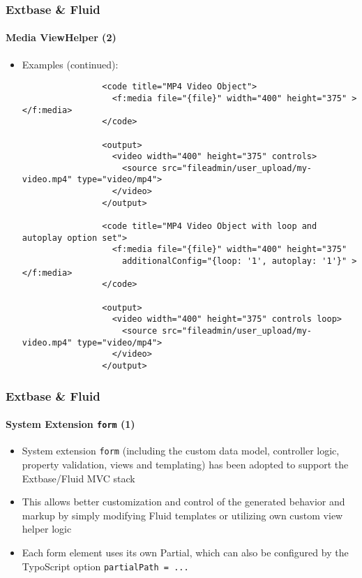 \begin{frame}[fragile]
	\frametitle{Extbase \& Fluid}
	\framesubtitle{Media ViewHelper (2)}

	\lstset{basicstyle=\tiny\ttfamily}

	\begin{itemize}

		\item Examples (continued):

			\begin{lstlisting}
				<code title="MP4 Video Object">
				  <f:media file="{file}" width="400" height="375" ></f:media>
				</code>

				<output>
				  <video width="400" height="375" controls>
				    <source src="fileadmin/user_upload/my-video.mp4" type="video/mp4">
				  </video>
				</output>

				<code title="MP4 Video Object with loop and autoplay option set">
				  <f:media file="{file}" width="400" height="375"
				    additionalConfig="{loop: '1', autoplay: '1'}" ></f:media>
				</code>

				<output>
				  <video width="400" height="375" controls loop>
				    <source src="fileadmin/user_upload/my-video.mp4" type="video/mp4">
				  </video>
				</output>
			\end{lstlisting}

	\end{itemize}

\end{frame}


\begin{frame}[fragile]
	\frametitle{Extbase \& Fluid}
	\framesubtitle{System Extension \texttt{form} (1)}

	\begin{itemize}

		\item System extension \texttt{form} (including the custom data model, controller
			logic, property validation, views and templating) has been adopted to support
			the Extbase/Fluid MVC stack

		\item This allows better customization and control of the generated behavior and
			markup by simply modifying Fluid templates or utilizing own custom view helper
			logic

		\item Each form element uses its own Partial, which can also be configured by
			the TypoScript option \texttt{partialPath = ...}

	\end{itemize}

\end{frame}

